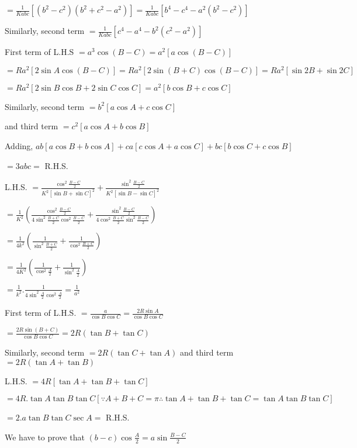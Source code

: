   $= \frac{1}{Kabc}[(b^2 - c^2)(b^2 + c^2 - a^2)] = \frac{1}{Kabc}[b^4 - c^4 -a^2(b^2 - c^2)]$

  Similarly, second term $= \frac{1}{Kabc}[c^4 - a^4 - b^2(c^2 - a^2)]$

\item First term of L.H.S $= a^3\cos(B - C) = a^2[a\cos(B - C)]$

  $= Ra^2[2\sin A\cos(B - C)] = Ra^2[2\sin(B + C)\cos(B - C)] = Ra^2[\sin2B + \sin2C]$

  $=Ra^2[2\sin B\cos B + 2\sin C\cos C] = a^2[b\cos B + c\cos C]$

  Similarly, second term $= b^2[a\cos A + c\cos C]$

  and third term $= c^2[a\cos A + b\cos B]$

  Adding, $ab[a\cos B + b\cos A] + ca[c\cos A + a\cos C] + bc[b\cos C + c\cos B]$

  $= 3abc =$ R.H.S.

\item L.H.S. $= \frac{\cos^2\frac{B - C}{2}}{K^2[\sin B + \sin C]^2} + \frac{\sin^2\frac{B - C}{2}}{K^2[\sin B - \sin C]^2}$

  $= \frac{1}{K^2}\left(\frac{\cos^2\frac{B - C}{2}}{4\sin^2\frac{B + C}{2}\cos^2\frac{B - C}{2}} + \frac{\sin^2\frac{B -
    C}{2}}{4\cos^2\frac{B + C}{2}\sin^2\frac{B - C}{2}}\right)$

  $= \frac{1}{4k^2}\left(\frac{1}{\sin^2\frac{B + C}{2}} + \frac{1}{\cos^2\frac{B + C}{2}}\right)$

  $= \frac{1}{4K^2}\left(\frac{1}{\cos^2\frac{A}{2}} + \frac{1}{\sin^2\frac{A}{2}}\right)$

  $= \frac{1}{k^2}.\frac{1}{4\sin^2\frac{A}{2}\cos^2\frac{A}{2}} = \frac{1}{a^2}$

\item First term of L.H.S. $= \frac{a}{\cos B\cos C} = \frac{2R\sin A}{\cos B\cos C}$

  $= \frac{2R\sin(B + C)}{\cos B\cos C} = 2R(\tan B + \tan C)$

  Similarly, second term $= 2R(\tan C + \tan A)$ and third term $= 2R(\tan A + \tan B)$

  L.H.S. $= 4R[\tan A + \tan B + \tan C]$

  $= 4R.\tan A\tan B\tan C[\because A + B + C = \pi \therefore \tan A + \tan B + \tan C = \tan A\tan B\tan C]$

  $= 2.a\tan B\tan C\sec A =$ R.H.S.

\item We have to prove that $(b - c)\cos\frac{A}{2} = a\sin\frac{B - C}{2}$

